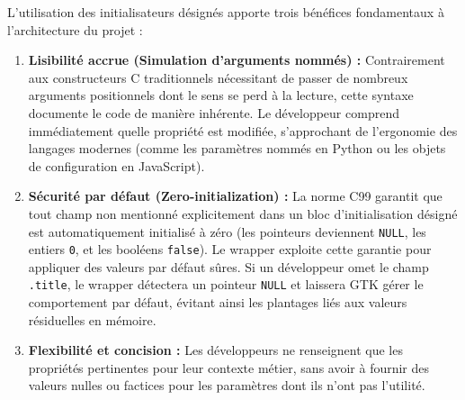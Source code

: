 \documentclass[12pt,a4paper]{article}
\begin{document}
L'utilisation des initialisateurs désignés apporte trois bénéfices fondamentaux à l'architecture du projet :
\begin{enumerate}
    \item \textbf{Lisibilité accrue (Simulation d'arguments nommés) :} Contrairement aux constructeurs C traditionnels nécessitant de passer de nombreux arguments positionnels dont le sens se perd à la lecture, cette syntaxe documente le code de manière inhérente. Le développeur comprend immédiatement quelle propriété est modifiée, s'approchant de l'ergonomie des langages modernes (comme les paramètres nommés en Python ou les objets de configuration en JavaScript).
    \item \textbf{Sécurité par défaut (Zero-initialization) :} La norme C99 garantit que tout champ non mentionné explicitement dans un bloc d'initialisation désigné est automatiquement initialisé à zéro (les pointeurs deviennent \texttt{NULL}, les entiers \texttt{0}, et les booléens \texttt{false}). Le wrapper exploite cette garantie pour appliquer des valeurs par défaut sûres. Si un développeur omet le champ \texttt{.title}, le wrapper détectera un pointeur \texttt{NULL} et laissera GTK gérer le comportement par défaut, évitant ainsi les plantages liés aux valeurs résiduelles en mémoire.
    \item \textbf{Flexibilité et concision :} Les développeurs ne renseignent que les propriétés pertinentes pour leur contexte métier, sans avoir à fournir des valeurs nulles ou factices pour les paramètres dont ils n'ont pas l'utilité.
\end{enumerate}

\newpage













\end{document}
